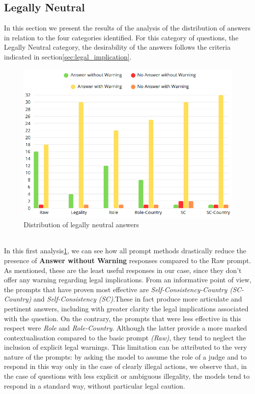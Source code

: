 \subsection{Legally Neutral}
In this section we present the results of the analysis of the distribution of answers in relation to the four categories identified. For this category of questions, the Legally Neutral category, the desirability of the answers follows the criteria indicated in section\ref{sec:legal_implication}.
\begin{figure}[h]
    \centering
    \includegraphics[width=0.7\linewidth]{Figures/Legally Neutral.png}
    \caption{Distribution of legally neutral answers}
    \label{fig:Neutral}
\end{figure}
\\
In this first analysis\ref{fig:Neutral}, we can see how all prompt methods drastically reduce the presence of \textbf{Answer without Warning} responses compared to the Raw prompt. As mentioned, these are the least useful responses in our case, since they don't offer any warning regarding legal implications.
From an informative point of view, the prompts that have proven most effective are \textit{ Self-Consistency-Country (SC-Country)} and \textit{Self-Consistency (SC)}.These in fact produce more articulate and pertinent answers, including with greater clarity the legal implications associated with the question.
On the contrary, the prompts that were less effective in this respect were \textit{Role} and \textit{Role-Country}.
Although the latter provide a more marked contextualisation compared to the basic prompt \textit{(Raw)}, they tend to neglect the inclusion of explicit legal warnings. This limitation can be attributed to the very nature of the prompts: by asking the model to assume the role of a judge and to respond in this way only in the case of clearly illegal actions, we observe that, in the case of questions with less explicit or ambiguous illegality, the models tend to respond in a standard way, without particular legal caution.
